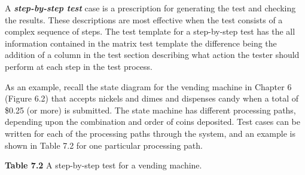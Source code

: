 A \emph{\textbf{step-by-step test}} case is a prescription for
generating the test and checking the results. These descriptions are
most effective when the test consists of a complex sequence of steps.
The test template for a step-by-step test has the all information
contained in the matrix test template the difference being the addition
of a column in the test section describing what action the tester should
perform at each step in the test process.

As an example, recall the state diagram for the vending machine in
Chapter 6 (Figure 6.2) that accepts nickels and dimes and dispenses
candy when a total of \$0.25 (or more) is submitted. The state machine
has different processing paths, depending upon the combination and order
of coins deposited. Test cases can be written for each of the processing
paths through the system, and an example is shown in Table 7.2 for one
particular processing path.

\textbf{\hfill\break
Table 7.2} A step-by-step test for a vending machine.

